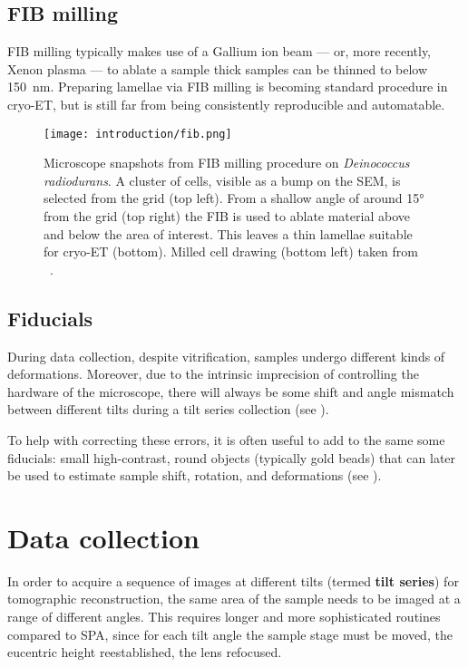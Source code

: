 \subsection{FIB milling}
FIB milling typically makes use of a Gallium ion beam --- or, more recently, Xenon plasma --- to ablate a sample
thick samples can be thinned to below \qty{150}{\nano\meter}.
Preparing lamellae via FIB milling is becoming standard procedure in cryo-ET, but is still far from being consistently reproducible and automatable.

\begin{figure}[ht]
    \centering
    \texttt{[image: introduction/fib.png]}
    \caption[FIB milling]{Microscope snapshots from FIB milling procedure on \textit{Deinococcus radiodurans}. A cluster of cells, visible as a bump on the SEM, is selected from the grid (top left). From a shallow angle of around \ang{15} from the grid (top right) the FIB is used to ablate material above and below the area of interest. This leaves a thin lamellae suitable for cryo-ET (bottom). Milled cell drawing (bottom left) taken from ~\citet{villaOpeningWindowsCell2013}.}
    \label{fig:et_fib_milling}
\end{figure}

\subsection{Fiducials}\label{fiducials}
During data collection, despite vitrification, samples undergo different kinds of deformations.
Moreover, due to the intrinsic imprecision of controlling the hardware of the microscope, there will always be some shift and angle mismatch between different tilts during a tilt series collection (see ).

To help with correcting these errors, it is often useful to add to the same some fiducials: small high-contrast, round objects (typically gold beads) that can later be used to estimate sample shift, rotation, and deformations (see ).

\section{Data collection}\label{et_data_collection}
In order to acquire a sequence of images at different tilts (termed \textbf{tilt series}) for tomographic reconstruction, the same area of the sample needs to be imaged at a range of different angles.
This requires longer and more sophisticated routines compared to SPA, since for each tilt angle the sample stage must be moved, the eucentric height reestablished, the lens refocused.

